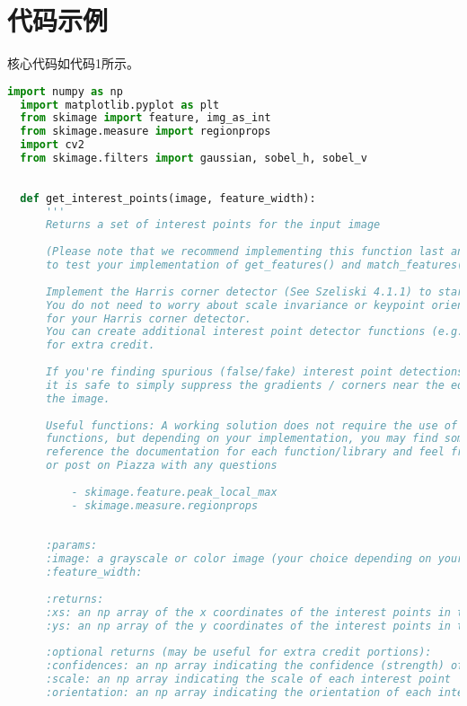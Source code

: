 \section{代码示例}

核心代码如代码1所示。

\begin{lstlisting}[caption={student.py}, label={lst:code-example}, captionpos=t, language=python]
  import numpy as np
  import matplotlib.pyplot as plt
  from skimage import feature, img_as_int
  from skimage.measure import regionprops
  import cv2
  from skimage.filters import gaussian, sobel_h, sobel_v
  
  
  def get_interest_points(image, feature_width):
      '''
      Returns a set of interest points for the input image
  
      (Please note that we recommend implementing this function last and using cheat_interest_points()
      to test your implementation of get_features() and match_features())
  
      Implement the Harris corner detector (See Szeliski 4.1.1) to start with.
      You do not need to worry about scale invariance or keypoint orientation estimation
      for your Harris corner detector.
      You can create additional interest point detector functions (e.g. MSER)
      for extra credit.
  
      If you're finding spurious (false/fake) interest point detections near the boundaries,
      it is safe to simply suppress the gradients / corners near the edges of
      the image.
  
      Useful functions: A working solution does not require the use of all of these
      functions, but depending on your implementation, you may find some useful. Please
      reference the documentation for each function/library and feel free to come to hours
      or post on Piazza with any questions
  
          - skimage.feature.peak_local_max
          - skimage.measure.regionprops
  
  
      :params:
      :image: a grayscale or color image (your choice depending on your implementation)
      :feature_width:
  
      :returns:
      :xs: an np array of the x coordinates of the interest points in the image
      :ys: an np array of the y coordinates of the interest points in the image
  
      :optional returns (may be useful for extra credit portions):
      :confidences: an np array indicating the confidence (strength) of each interest point
      :scale: an np array indicating the scale of each interest point
      :orientation: an np array indicating the orientation of each interest point
  

\end{lstlisting}
